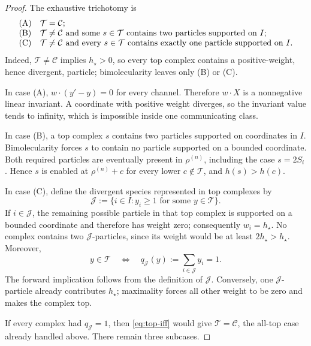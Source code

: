 \begin{proof}
The exhaustive trichotomy is
\[
\begin{array}{ll}
\textup{(A)}&\mathcal T=\mathcal C;\\
\textup{(B)}&\mathcal T\ne\mathcal C\text{ and some }s\in\mathcal T
  \text{ contains two particles supported on }I;\\
\textup{(C)}&\mathcal T\ne\mathcal C\text{ and every }s\in\mathcal T
  \text{ contains exactly one particle supported on }I.
\end{array}
\]
Indeed, \(\mathcal T\ne\mathcal C\) implies \(h_\star>0\), so every top
complex contains a positive-weight, hence divergent, particle; bimolecularity
leaves only \textup{(B)} or \textup{(C)}.

In case \textup{(A)}, \(w\cdot(y'-y)=0\) for every channel.  Therefore
\(w\cdot X\) is a nonnegative linear invariant.  A coordinate with positive
weight diverges, so the invariant value tends to infinity, which is impossible
inside one communicating class.

In case \textup{(B)}, a top complex \(s\) contains two particles supported on
coordinates in \(I\).  Bimolecularity forces \(s\) to contain no particle
supported on a bounded coordinate.  Both required particles are eventually
present in \(\rho^{(n)}\), including the case \(s=2S_i\).  Hence \(s\) is
enabled at \(\rho^{(n)}+c\) for every lower \(c\notin\mathcal T\), and
\(h(s)>h(c)\).

In case \textup{(C)}, define the divergent species represented in top
complexes by
\[
  \mathcal J:=\{i\in I:y_i\ge1\text{ for some }y\in\mathcal T\}.
\]
If \(i\in\mathcal J\), the remaining possible particle in that top complex is
supported on a bounded coordinate and therefore has weight zero; consequently
\(w_i=h_\star\).  No complex contains two \(\mathcal J\)-particles, since its
weight would be at least \(2h_\star>h_\star\).  Moreover,
\begin{equation}\label{eq:top-iff}
  y\in\mathcal T\quad\Longleftrightarrow\quad
  q_{\mathcal J}(y):=\sum_{i\in\mathcal J}y_i=1.
\end{equation}
The forward implication follows from the definition of \(\mathcal J\).
Conversely, one \(\mathcal J\)-particle already contributes \(h_\star\);
maximality forces all other weight to be zero and makes the complex top.

If every complex had \(q_{\mathcal J}=1\), then \eqref{eq:top-iff} would give
\(\mathcal T=\mathcal C\), the all-top case already handled above.  There
remain three subcases.


\end{proof}
